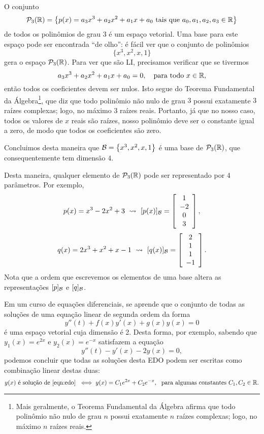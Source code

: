 \documentclass[../livro.tex]{subfiles}  %
\begin{document}
\begin{example}
	O conjunto
	\[
	\mathcal{P}_3 (\mathbb{R}) = \big\{ p(x) = a_3 x^3 + a_2 x^2 + a_1 x + a_0 \text{ tais que } a_0, a_1, a_2, a_3 \in \mathbb{R} \big\}
	\] de todos os polinômios de grau 3 é um espaço vetorial. Uma base para este espaço pode ser encontrada ``de olho'': é fácil ver que o conjunto de polinômios
	\[
	\big\{ x^3, x^2, x, 1 \big\}
	\] gera o espaço $\mathcal{P}_3 (\mathbb{R})$. Para ver que são LI, precisamos verificar que se tivermos
	\[
	a_3 x^3 + a_2 x^2 + a_1 x + a_0 = 0, \quad \text{para todo } x \in \mathbb{R},
	\] então todos os coeficientes devem ser nulos. Isto segue do Teorema Fundamental da Álgebra\footnote{Mais geralmente, o Teorema Fundamental da Álgebra afirma que todo polinômio não nulo de grau $n$ possui exatamente $n$ raízes complexas; logo, no máximo $n$ raízes reais.}, que diz que todo polinômio não nulo de grau $3$ possui exatamente $3$ raízes complexas; logo, no máximo $3$ raízes reais. Portanto, já que no nosso caso, todos os valores de $x$ reais são raízes, nosso polinômio deve ser o constante igual a zero, de modo que todos os coeficientes são zero.
	
	Concluimos desta maneira que $\mathcal{B} = \big\{ x^3, x^2, x, 1 \big\}$ é uma base de $\mathcal{P}_3 (\mathbb{R})$, que consequentemente tem dimensão $4.$
	
	Desta maneira, qualquer elemento de $\mathcal{P}_3 (\mathbb{R})$ pode ser representado por $4$ parâmetros. Por exemplo,
	\[
	p(x) = x^3 - 2 x^2 + 3 \ \rightsquigarrow \ [p(x)]_{\mathcal{B}} = \left[
	\begin{array}{c}
	1 \\
	-2 \\
	0 \\
	3 \\
	\end{array}
	\right],
	\]
	\[
	q(x) = 2 x^3 + x^2 + x -1 \ \rightsquigarrow \ [q(x)]_{\mathcal{B}} = \left[
	\begin{array}{c}
	2 \\
	1 \\
	1 \\
	-1 \\
	\end{array}
	\right].
	\] Nota que a ordem que escrevemos os elementos de uma base altera as representações $[p]_{\mathcal{B}}$ e $[q]_{\mathcal{B}}$.
\end{example}


\begin{example}
	Em um curso de equações diferenciais, se aprende que o conjunto de todas as soluções de uma equação linear de segunda ordem da forma
	\[
	y''(t) + f(x) y'(x) + g(x) y(x) = 0
	\] é uma espaço vetorial cuja dimensão é 2. Desta forma, por exemplo, sabendo que $y_1(x) = e^{2x}$ e $y_2 (x) = e^{-x}$ satisfazem a equação
	\begin{equation}\label{eqn:edo}
	y''(t) - y'(x) -2 y(x) = 0,
	\end{equation} podemos concluir que todas as soluções desta EDO podem ser escritas como combinação linear destas duas:
	\[
	y(x) \text{ é solução de \eqref{eqn:edo} } \iff y(x) = C_1 e^{2x} + C_2 e^{-x}, \ \text{ para algumas constantes } C_1, C_2 \in \bR.
	\]
\end{example}
\end{document}
